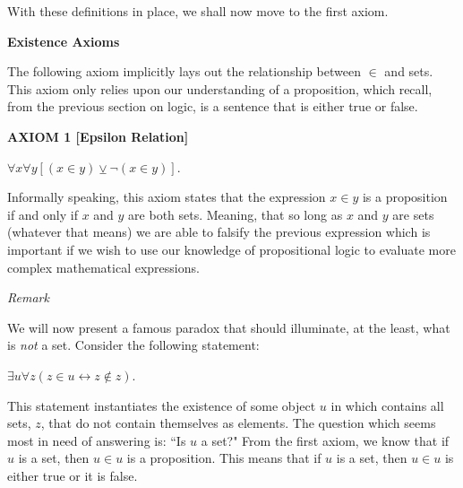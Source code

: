 \documentclass[12pt, a4paper]{article}
\begin{document}
\noindent With these definitions in place, we shall now move to the first axiom.

\vspace{8mm}

\noindent\large{\textbf{Existence Axioms}}\normalsize

\vspace{4mm}

\noindent The following axiom implicitly lays out the relationship between $\in$ and sets. This axiom only relies upon our understanding of a proposition, which recall, from the previous section on logic, is a sentence that is either true or false.\par

\vspace{4mm}

\noindent\blacksquare\textbf{ AXIOM 1 [Epsilon Relation]}\par

\vspace{4mm}

$\forall x\forall y[(x\in y)\veebar\neg(x\in y)]$.\par

\vspace{4mm}

\noindent Informally speaking, this axiom states that the expression $x\in y$ is a proposition if and only if $x$ and $y$ are both sets. Meaning, that so long as $x$ and $y$ are sets (whatever that means) we are able to falsify the previous expression which is important if we wish to use our knowledge of propositional logic to evaluate more complex mathematical expressions.

\vspace{8mm}

\noindent\large{\textit{Remark}}\normalsize

\vspace{4mm}

\noindent We will now present a famous paradox that should illuminate, at the least, what is \textit{not} a set. Consider the following statement:\par

\vspace{4mm}

\centerline{$\exists u\forall z(z\in u\leftrightarrow z\notin z)$.}

\newpage

\noindent This statement instantiates the existence of some object $u$ in which contains all sets, $z$, that do not contain themselves as elements. The question which seems most in need of answering is: ``Is $u$ a set?" From the first axiom, we know that if $u$ is a set, then $u\in u$ is a proposition. This means that if $u$ is a set, then $u\in u$ is either true or it is false.\par
\end{document}
